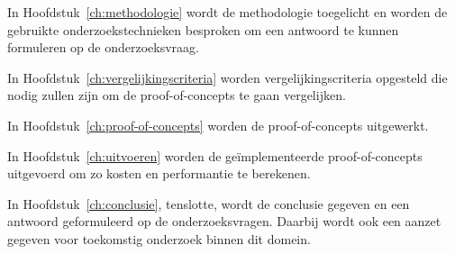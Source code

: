 In Hoofdstuk~\ref{ch:methodologie} wordt de methodologie toegelicht en worden de gebruikte onderzoekstechnieken besproken om een antwoord te kunnen formuleren op de onderzoeksvraag.

In Hoofdstuk~\ref{ch:vergelijkingscriteria} worden vergelijkingscriteria opgesteld die nodig zullen zijn om de proof-of-concepts te gaan vergelijken.

In Hoofdstuk~\ref{ch:proof-of-concepts} worden de proof-of-concepts uitgewerkt.

In Hoofdstuk~\ref{ch:uitvoeren} worden de geïmplementeerde proof-of-concepts uitgevoerd om zo kosten en performantie te berekenen.

In Hoofdstuk~\ref{ch:conclusie}, tenslotte, wordt de conclusie gegeven en een antwoord geformuleerd op de onderzoeksvragen. Daarbij wordt ook een aanzet gegeven voor toekomstig onderzoek binnen dit domein.